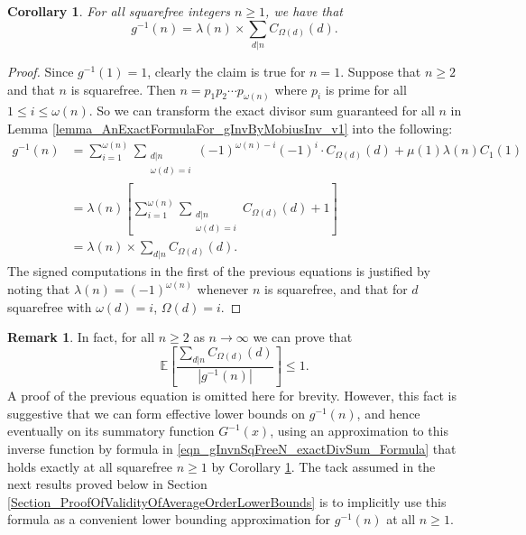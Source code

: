 \documentclass[11pt,reqno,a4letter]{article}
\numberwithin{figure}{section}
\numberwithin{table}{section}
\theoremstyle{plain}
\newtheorem{cor}[theorem]{Corollary}
\numberwithin{theorem}{section}
\theoremstyle{definition}
\newtheorem{remark}[theorem]{Remark}
\begin{document}
\begin{cor} 
\label{cor_AnExactFormulaFor_gInvByMobiusInv_nSqFree_v2} 
For all squarefree integers $n \geq 1$, we have that 
\begin{equation} 
\label{eqn_gInvnSqFreeN_exactDivSum_Formula} 
g^{-1}(n) = \lambda(n) \times \sum_{d|n} C_{\Omega(d)}(d). 
\end{equation} 
\end{cor} 
\begin{proof} 
Since $g^{-1}(1) = 1$, clearly the claim is true for $n = 1$. Suppose that $n \geq 2$ and that 
$n$ is squarefree. Then $n = p_1p_2 \cdots p_{\omega(n)}$ where $p_i$ is prime for all 
$1 \leq i \leq \omega(n)$. So we can transform the exact divisor sum guaranteed for all $n$ in 
Lemma \ref{lemma_AnExactFormulaFor_gInvByMobiusInv_v1} into the following: 
\begin{align*} 
g^{-1}(n) & = \sum_{i=1}^{\omega(n)} \sum_{\substack{d|n \\ \omega(d)=i}} (-1)^{\omega(n) - i} (-1)^{i} \cdot 
     C_{\Omega(d)}(d) + \mu(1) \lambda(n) C_1(1) \\ 
     & = \lambda(n) \left[\sum_{i=1}^{\omega(n)} \sum_{\substack{d|n \\ \omega(d)=i}} C_{\Omega(d)}(d) + 1\right] \\ 
     & = \lambda(n) \times \sum_{d|n} C_{\Omega(d)}(d). 
\end{align*} 
The signed computations in the first of the previous equations is justified by noting that $\lambda(n) = (-1)^{\omega(n)}$ 
whenever $n$ is squarefree, and that for $d$ squarefree with $\omega(d) = i$, $\Omega(d) = i$. 
\end{proof} 

\begin{remark} 
In fact, for all $n \geq 2$ as $n \rightarrow \infty$ we can prove that 
\[
\mathbb{E}\left[\frac{\sum\limits_{d|n} C_{\Omega(d)}(d)}{|g^{-1}(n)|}\right] \leq 1. 
\]
A proof of the previous equation is omitted here for brevity. However, this fact is 
suggestive that we can form effective lower bounds on 
$g^{-1}(n)$, and hence eventually on its summatory function $G^{-1}(x)$, 
using an approximation to this inverse function by formula in 
\eqref{eqn_gInvnSqFreeN_exactDivSum_Formula} 
that holds exactly at all squarefree $n \geq 1$ by 
Corollary \ref{cor_AnExactFormulaFor_gInvByMobiusInv_nSqFree_v2}. 
The tack assumed in the next results proved below in 
Section \ref{Section_ProofOfValidityOfAverageOrderLowerBounds} 
is to implicitly use this formula as a convenient lower bounding 
approximation for $g^{-1}(n)$ at all $n \geq 1$. 
\end{remark} 
\end{document}
